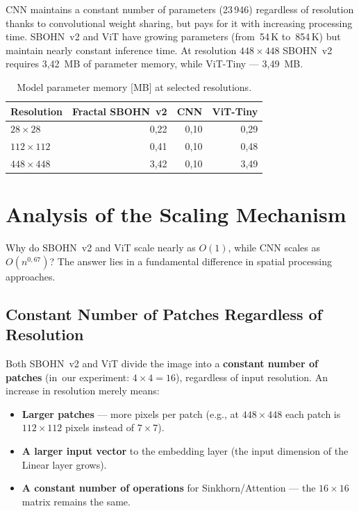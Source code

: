 \documentclass[11pt,a4paper]{report}
\begin{document}
CNN maintains a constant number of parameters (23\,946) regardless of resolution thanks to convolutional weight sharing, but pays for it with increasing processing time. SBOHN~v2 and ViT have growing parameters (from~54\,K to~854\,K) but maintain nearly constant inference time. At resolution $448\times448$ SBOHN~v2 requires 3{,}42~MB of parameter memory, while ViT-Tiny --- 3{,}49~MB.

\begin{table}[htbp]
\centering
\caption{Model parameter memory [MB] at selected resolutions.}
\label{tab:sota_mem}
\begin{tabular}{|l|r|r|r|}
\hline
\textbf{Resolution} & \textbf{Fractal SBOHN~v2} & \textbf{CNN} & \textbf{ViT-Tiny} \\
\hline
$28\times28$ & 0,22 & 0,10 & 0,29 \\
\hline
$112\times112$ & 0,41 & 0,10 & 0,48 \\
\hline
$448\times448$ & 3,42 & 0,10 & 3,49 \\
\hline
\end{tabular}
\end{table}


\section{Analysis of the Scaling Mechanism}

Why do SBOHN~v2 and ViT scale nearly as $O(1)$, while CNN scales as $O(n^{0{,}67})$? The answer lies in a fundamental difference in spatial processing approaches.

\subsection{Constant Number of Patches Regardless of Resolution}

Both SBOHN~v2 and ViT divide the image into a \textbf{constant number of patches} (in~our experiment: $4\times4 = 16$), regardless of input resolution. An increase in resolution merely means:
\begin{itemize}
    \item \textbf{Larger patches} --- more pixels per patch (e.g., at $448\times448$ each patch is $112\times112$ pixels instead of $7\times7$).
    \item \textbf{A larger input vector} to the embedding layer (the input dimension of the Linear layer grows).
    \item \textbf{A constant number of operations} for Sinkhorn/Attention --- the $16\times16$ matrix remains the same.
\end{itemize}
\end{document}
